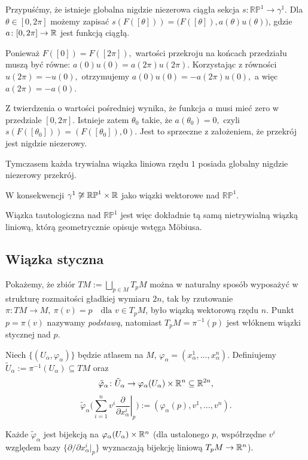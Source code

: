 \begin{przyklad}
Przypuśćmy, że istnieje globalna
nigdzie niezerowa ciągła sekcja
$
s\colon\mathbb{RP}^1\longrightarrow\gamma^1.
$
Dla $\theta\in[0,2\pi]$ możemy zapisać $s(F([\theta])) = \bigl(F([\theta]),a(\theta)u(\theta)\bigr)$,
gdzie $a\colon[0,2\pi]\to\mathbb{R}$
jest funkcją ciągłą.

Ponieważ
$
F([0])=F([2\pi]),
$
wartości przekroju na końcach przedziału
muszą być równe:
$
a(0)u(0)=a(2\pi)u(2\pi).
$
Korzystając z równości
$
u(2\pi)=-u(0),
$
otrzymujemy
$
a(0)u(0)=-a(2\pi)u(0),
$
a więc
$
a(2\pi)=-a(0).
$

Z twierdzenia o wartości pośredniej
wynika, że funkcja $a$ musi mieć zero
w przedziale $[0,2\pi]$.
Istnieje zatem $\theta_0$ takie, że
$
a(\theta_0)=0,
$
czyli
$
s(F([\theta_0]))
=
(F([\theta_0]),0).
$
Jest to sprzeczne z założeniem,
że przekrój jest nigdzie niezerowy.

Tymczasem każda trywialna wiązka
liniowa rzędu $1$ posiada globalny
nigdzie niezerowy przekrój.

W konsekwencji
$
\gamma^1\not\cong\mathbb{RP}^1\times\mathbb{R}
$
jako wiązki wektorowe nad $\mathbb{RP}^1$.

Wiązka tautologiczna nad $\mathbb{RP}^1$
jest więc dokładnie tą samą
nietrywialną wiązką liniową,
którą geometrycznie opisuje wstęga Möbiusa.
\end{przyklad}

\subsection*{Wiązka styczna}

Pokażemy, że zbiór $TM:=\bigsqcup_{p\in M}T_pM$
można w naturalny sposób wyposażyć w strukturę rozmaitości gładkiej
wymiaru $2n$, tak by rzutowanie $\pi\colon TM\to M, \ \pi(v)=p \quad\text{dla }v\in T_pM$,
było wiązką wektorową rzędu $n$.
Punkt $p=\pi(v)$ nazywamy \emph{podstawą}, natomiast
$T_pM=\pi^{-1}(p)$ jest włóknem wiązki stycznej nad $p$.

Niech $\{(U_\alpha,\varphi_\alpha)\}$ będzie atlasem na $M$,
$\varphi_\alpha=(x^1_\alpha,\dots,x^n_\alpha)$.
Definiujemy $\tilde U_\alpha:=\pi^{-1}(U_\alpha)\subseteq TM$
oraz
\[
\tilde\varphi_\alpha\colon
\tilde U_\alpha\to
\varphi_\alpha(U_\alpha)\times\mathbb{R}^n\subseteq\mathbb{R}^{2n},
\]
\[
\tilde\varphi_\alpha\Big(
\sum_{i=1}^n v^i
\left.\frac{\partial}{\partial x^i_\alpha}\right|_p
\Big)
:=
(\varphi_\alpha(p),v^1,\dots,v^n).
\]

Każde $\tilde\varphi_\alpha$ jest bijekcją na $\varphi_\alpha(U_\alpha)\times\mathbb{R}^n$
(dla ustalonego $p$, współrzędne $v^i$ względem bazy $\{\partial/\partial x^i_\alpha|_p\}$
wyznaczają bijekcję liniową $T_pM\to\mathbb{R}^n$).

